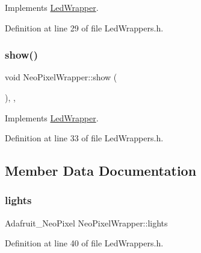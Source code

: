 Implements \hyperlink{class_led_wrapper_ac20a5afaaaaa2c275d7f6008ace09c41}{Led\+Wrapper}.



Definition at line 29 of file Led\+Wrappers.\+h.

\mbox{\label{class_neo_pixel_wrapper_a965564daa3e81baefb9947c28633f06a}} 
\subsubsection{\texorpdfstring{show()}{show()}}
{\footnotesize\ttfamily void Neo\+Pixel\+Wrapper\+::show (\begin{DoxyParamCaption}{ }\end{DoxyParamCaption})\hspace{0.3cm}{\ttfamily [inline]}, {\ttfamily [override]}, {\ttfamily [virtual]}}



Implements \hyperlink{class_led_wrapper_a82048b562a501a0a46e5953d2cdb2549}{Led\+Wrapper}.



Definition at line 33 of file Led\+Wrappers.\+h.



\subsection{Member Data Documentation}
\mbox{\label{class_neo_pixel_wrapper_a059056899c5ab29bced35b32f05918c3}} 
\subsubsection{\texorpdfstring{lights}{lights}}
{\footnotesize\ttfamily Adafruit\+\_\+\+Neo\+Pixel Neo\+Pixel\+Wrapper\+::lights\hspace{0.3cm}{\ttfamily [private]}}



Definition at line 40 of file Led\+Wrappers.\+h.

\mbox{\label{class_neo_pixel_wrapper_a1e4129f56a27f2533dc8ed2c9ddde84b}} 
